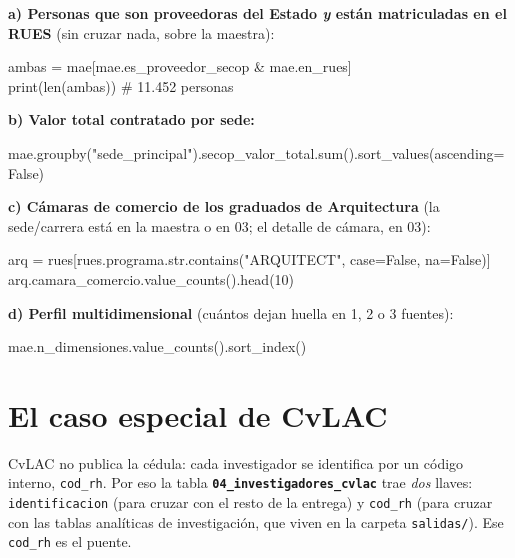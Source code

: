 \documentclass[11pt,letterpaper]{article}
\newcommand{\col}[1]{\texttt{\small #1}}
\newcommand{\file}[1]{{\small\textbf{\texttt{#1}}}}
\begin{document}
\textbf{a) Personas que son proveedoras del Estado \emph{y} están matriculadas en el RUES} (sin cruzar nada, sobre la maestra):
\begin{code}\ttfamily\small
ambas = mae[mae.es\_proveedor\_secop \& mae.en\_rues]\\
print(len(ambas))   \# 11.452 personas
\end{code}

\textbf{b) Valor total contratado por sede:}
\begin{code}\ttfamily\small
mae.groupby("sede\_principal").secop\_valor\_total.sum().sort\_values(ascending=False)
\end{code}

\textbf{c) Cámaras de comercio de los graduados de Arquitectura} (la sede/carrera está en la maestra o en 03; el detalle de cámara, en 03):
\begin{code}\ttfamily\small
arq = rues[rues.programa.str.contains("ARQUITECT", case=False, na=False)]\\
arq.camara\_comercio.value\_counts().head(10)
\end{code}

\textbf{d) Perfil multidimensional} (cuántos dejan huella en 1, 2 o 3 fuentes):
\begin{code}\ttfamily\small
mae.n\_dimensiones.value\_counts().sort\_index()
\end{code}

\section{El caso especial de CvLAC}

CvLAC no publica la cédula: cada investigador se identifica por un código interno, \col{cod\_rh}. Por eso la tabla \file{04\_investigadores\_cvlac} trae \emph{dos} llaves: \col{identificacion} (para cruzar con el resto de la entrega) y \col{cod\_rh} (para cruzar con las tablas analíticas de investigación, que viven en la carpeta \col{salidas/}). Ese \col{cod\_rh} es el puente.

\begin{center}
\end{center}
\end{document}
